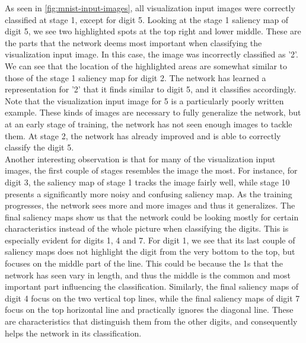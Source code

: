 \noindent As seen in \autoref{fig:mnist-input-images}, all visualization input images were correctly classified at stage 1, except for digit 5. Looking at the stage 1 saliency map of digit 5, we see two highlighted spots at the top right and lower middle. These are the parts that the network deems most important when classifying the visualization input image. In this case, the image was incorrectly classified as '2'. We can see that the location of the highlighted areas are somewhat similar to those of the stage 1 saliency map for digit 2. The network has learned a representation for '2' that it finds similar to digit 5, and it classifies accordingly. Note that the visualization input image for 5 is a particularly poorly written example. These kinds of images are necessary to fully generalize the network, but at an early stage of training, the network has not seen enough images to tackle them. At stage 2, the network has already improved and is able to correctly classify the digit 5. \\

\noindent Another interesting observation is that for many of the visualization input images, the first couple of stages resembles the image the most. For instance, for digit 3, the saliency map of stage 1 tracks the image fairly well, while stage 10 presents a significantly more noisy and confusing saliency map. As the training progresses, the network sees more and more images and thus it generalizes. The final saliency maps show us that the network could be looking mostly for certain characteristics instead of the whole picture when classifying the digits. This is especially evident for digits 1, 4 and 7. For digit 1, we see that its last couple of saliency maps does not highlight the digit from the very bottom to the top, but focuses on the middle part of the line. This could be because the 1s that the network has seen vary in length, and thus the middle is the common and most important part influencing the classification. Similarly, the final saliency maps of digit 4 focus on the two vertical top lines, while the final saliency maps of digit 7 focus on the top horizontal line and practically ignores the diagonal line. These are characteristics that distinguish them from the other digits, and consequently helps the network in its classification. \\

